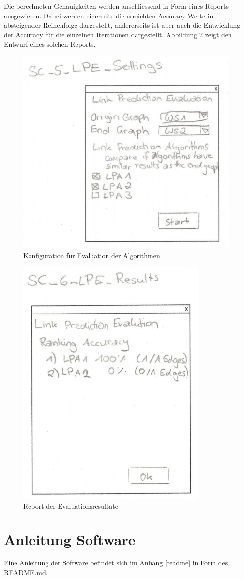 Die berechneten Genauigkeiten werden anschliessend in Form eines Reports ausgewiesen.
Dabei werden einerseits die erreichten Accuracy-Werte in absteigender Reihenfolge dargestellt, andererseits ist aber auch die Entwicklung der Accuracy für die einzelnen Iterationen dargestellt.
Abbildung \ref{fig:screen10} zeigt den Entwurf eines solchen Reports.

\begin{figure}
    \centering
    \includegraphics[width=0.5\linewidth]{resources/EV-3.png}
    \caption{Konfiguration für Evaluation der Algorithmen}
    \label{fig:screen9}
\end{figure}

\begin{figure}
    \centering
    \includegraphics[width=0.5\linewidth]{resources/EV-4.png}
    \caption{Report der Evaluationsresultate}
    \label{fig:screen10}
\end{figure}

\section{Anleitung Software}

Eine Anleitung der Software befindet sich im Anhang \ref{readme} in Form des README.md.
